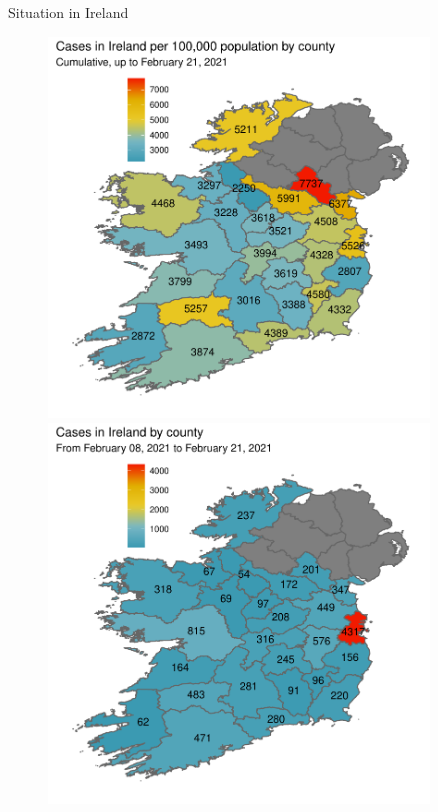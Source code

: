 \documentclass{beamer}
\begin{document}
\begin{frame}{Situation in Ireland \cite{irelanddata}}
\begin{figure}
\centering
{}
\includegraphics[width=0.9\textwidth]{Plots/county-rep.pdf}
\endminipage\hfill
{}
\includegraphics[width=0.9\textwidth]{Plots/county-fourteendaycases.pdf}
\endminipage
\end{figure}
\end{frame}
\end{document}
